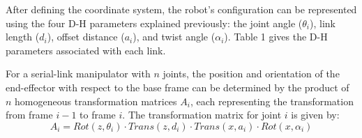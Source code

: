 \noindent After defining the coordinate system, the robot’s configuration can be represented using the four D-H parameters explained previously: the joint angle ($\theta_i$), link length ($d_i$), offset distance ($a_i$), and twist angle ($\alpha_i$). Table 1 gives the D-H parameters associated with each link.



\renewcommand{\arraystretch}{1.3}

\begin{table}[H]
  \centering\label{tab:dh_parameters}
  \caption{DH Parameters of ABB IRB 120}
\end{table}

\noindent
\noindent For a serial-link manipulator with \( n \) joints, the position and orientation of the end-effector with respect to the base frame can be determined by the product of \( n \) homogeneous transformation matrices \( A_i \), each representing the transformation from frame \( i-1 \) to frame \( i \). The transformation matrix for joint \( i \) is given by:
\noindent
\[
  A_i = Rot(z, \theta_i) \cdot Trans(z, d_i) \cdot Trans(x, a_i) \cdot Rot(x, \alpha_i)
\]

